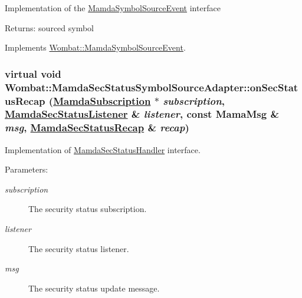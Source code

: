 Implementation of the \hyperlink{classWombat_1_1MamdaSymbolSourceEvent}{Mamda\-Symbol\-Source\-Event} interface

\begin{Desc}
\item[Returns:]sourced symbol \end{Desc}


Implements \hyperlink{classWombat_1_1MamdaSymbolSourceEvent_f55521a5c392761f1a17d3a3a0e24411}{Wombat::Mamda\-Symbol\-Source\-Event}.\hypertarget{classWombat_1_1MamdaSecStatusSymbolSourceAdapter_a1a7e7d772ee646d2104beb1f764efba}{
\subsubsection[onSecStatusRecap]{\setlength{\rightskip}{0pt plus 5cm}virtual void Wombat::Mamda\-Sec\-Status\-Symbol\-Source\-Adapter::on\-Sec\-Status\-Recap (\hyperlink{classWombat_1_1MamdaSubscription}{Mamda\-Subscription} $\ast$ {\em subscription}, \hyperlink{classWombat_1_1MamdaSecStatusListener}{Mamda\-Sec\-Status\-Listener} \& {\em listener}, const Mama\-Msg \& {\em msg}, \hyperlink{classWombat_1_1MamdaSecStatusRecap}{Mamda\-Sec\-Status\-Recap} \& {\em recap})}}
\label{classWombat_1_1MamdaSecStatusSymbolSourceAdapter_a1a7e7d772ee646d2104beb1f764efba}


Implementation of \hyperlink{classWombat_1_1MamdaSecStatusHandler}{Mamda\-Sec\-Status\-Handler} interface. 

\begin{Desc}
\item[Parameters:]
\begin{description}
\item[{\em subscription}]The security status subscription. \item[{\em listener}]The security status listener. \item[{\em msg}]The security status update message. \end{description}
\end{Desc}


